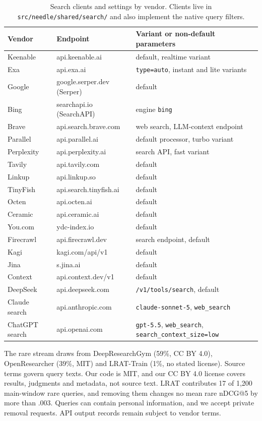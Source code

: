 \documentclass[11pt]{article}
\makeatletter
\newcommand{\ndcg}{nDCG@5\xspace}
\makeatother
\begin{document}
\begin{table}[t]
\centering\footnotesize
\setlength{\tabcolsep}{4pt}
\begin{tabular}{@{}lll@{}}
\toprule
Vendor & Endpoint & Variant or non-default parameters \\
\midrule
Keenable & api.keenable.ai & default, realtime variant \\
Exa & api.exa.ai & \texttt{type=auto}, instant and lite variants \\
Google & google.serper.dev (Serper) & default \\
Bing & searchapi.io (SearchAPI) & engine \texttt{bing} \\
Brave & api.search.brave.com & web search, LLM-context endpoint \\
Parallel & api.parallel.ai & default processor, turbo variant \\
Perplexity & api.perplexity.ai & search API, fast variant \\
Tavily & api.tavily.com & default \\
Linkup & api.linkup.so & default \\
TinyFish & api.search.tinyfish.ai & default \\
Octen & api.octen.ai & default \\
Ceramic & api.ceramic.ai & default \\
You.com & ydc-index.io & default \\
Firecrawl & api.firecrawl.dev & search endpoint, default \\
Kagi & kagi.com/api/v1 & default \\
Jina & s.jina.ai & default \\
Context & api.context.dev/v1 & default \\
DeepSeek & api.deepseek.com & \texttt{/v1/tools/search}, default \\
Claude search & api.anthropic.com & \texttt{claude-sonnet-5}, \texttt{web\_search} \\
ChatGPT search & api.openai.com & \texttt{gpt-5.5}, \texttt{web\_search}, \texttt{search\_context\_size=low} \\
\bottomrule
\end{tabular}
\caption{Search clients and settings by vendor. Clients live in
\texttt{src/needle/shared/search/} and also implement the native query
filters.}
\label{tab:config}
\end{table}

The rare stream draws from DeepResearchGym
\citep{coelho2026deepresearchgym,ning2026agentic} (59\%, CC BY 4.0),
OpenResearcher \citep{li2026openresearcher} (39\%, MIT) and LRAT-Train
\citep{zhou2026lrat} (1\%, no stated license). Source terms govern query
texts. Our code is MIT, and our CC BY 4.0 license covers results,
judgments and metadata, not source text. LRAT contributes 17 of 1,200
main-window rare queries, and removing them changes no mean rare \ndcg by
more than .003. Queries can contain personal information, and
we accept private removal requests. API output records remain subject to
vendor terms.
\end{document}
